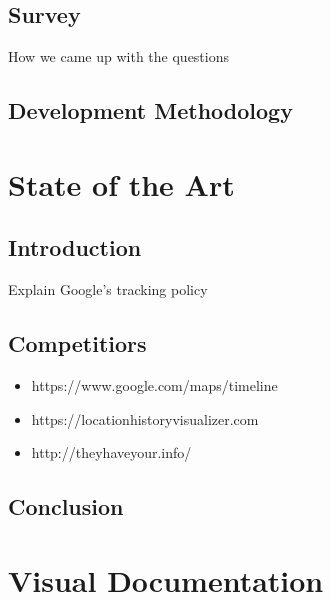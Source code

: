 \documentclass[12p]{article}
\begin{document}
		\subsection{Survey}
		How we came up with the questions
		
		\subsection{Development Methodology}
		
		
		\newpage
		\section{State of the Art} \label{sec:StateOfTheArt}
		\subsection{Introduction}
		
		Explain Google's tracking policy
		
		\newpage
		\subsection{Competitiors}
		\begin{itemize}
			\item https://www.google.com/maps/timeline
			\item https://locationhistoryvisualizer.com
			\item http://theyhaveyour.info/
		\end{itemize}
		
		\newpage
		\subsection{Conclusion}
		
		
		\clearpage
		\section{Visual Documentation} \label{VisualDocumentation}
\end{document}
